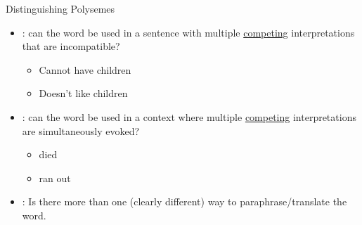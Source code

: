 
\begin{frame}{Distinguishing Polysemes}

\begin{itemize}
\item {}: can the word be used in a sentence with
  multiple \underline{competing} interpretations that are incompatible? \\[1ex]
  \begin{itemize}
  \item Cannot have children
  \item Doesn't like children
  \end{itemize}
\item {}: can the word be used in a context where multiple
  \underline{competing} interpretations are simultaneously evoked? \\[1ex]
    \begin{itemize}
    \item died
    \item ran out
    \end{itemize}
  \task
  \item  {}: Is there more than one (clearly different) way to paraphrase/translate the word.
  \end{itemize}
\end{frame}

